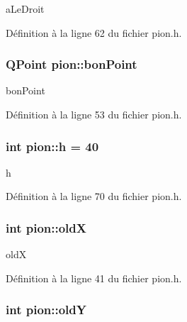 a\-Le\-Droit 



Définition à la ligne 62 du fichier pion.\-h.

\hypertarget{classpion_a7642cd4d43560d2fd90c33aa566d2526}{
\subsubsection[{bon\-Point}]{\setlength{\rightskip}{0pt plus 5cm}Q\-Point pion\-::bon\-Point\hspace{0.3cm}{\ttfamily [private]}}}\label{classpion_a7642cd4d43560d2fd90c33aa566d2526}


bon\-Point 



Définition à la ligne 53 du fichier pion.\-h.

\hypertarget{classpion_a432598bfa12510f56629bb8e4e44a6d1}{
\subsubsection[{h}]{\setlength{\rightskip}{0pt plus 5cm}int pion\-::h = 40\hspace{0.3cm}{\ttfamily [private]}}}\label{classpion_a432598bfa12510f56629bb8e4e44a6d1}


h 



Définition à la ligne 70 du fichier pion.\-h.

\hypertarget{classpion_ac953cdf61df0ff4b445b278e3be2bffc}{
\subsubsection[{old\-X}]{\setlength{\rightskip}{0pt plus 5cm}int pion\-::old\-X\hspace{0.3cm}{\ttfamily [private]}}}\label{classpion_ac953cdf61df0ff4b445b278e3be2bffc}


old\-X 



Définition à la ligne 41 du fichier pion.\-h.

\hypertarget{classpion_a842a7ce1b21307287e434dd9d598eaee}{
\subsubsection[{old\-Y}]{\setlength{\rightskip}{0pt plus 5cm}int pion\-::old\-Y\hspace{0.3cm}{\ttfamily [private]}}}\label{classpion_a842a7ce1b21307287e434dd9d598eaee}


